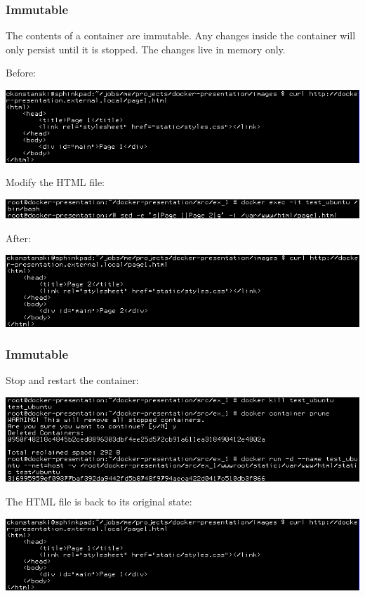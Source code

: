\documentclass[helvetica,english,utf8,notitle,nologo]{beamer}
\begin{document}
\begin{frame}
  \frametitle{Immutable}

  The contents of a container are immutable. Any changes inside the
  container will only persist until it is stopped. The changes live in
  memory only.

  Before:

  \includegraphics[scale=0.44]{image_12}

  Modify the HTML file:

  \includegraphics[scale=0.44]{image_14}

  After:

  \includegraphics[scale=0.44]{image_13}
\end{frame}

\begin{frame}
  \frametitle{Immutable}

  Stop and restart the container:

  \includegraphics[scale=0.44]{image_15}

  The HTML file is back to its original state:

  \includegraphics[scale=0.44]{image_16}
\end{frame}
\end{document}
